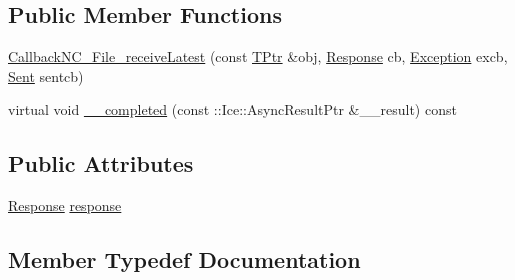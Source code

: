 \subsection*{Public Member Functions}
\begin{DoxyCompactItemize}
\item 
\hyperlink{class_file_system_1_1_callback_n_c___file__receive_latest_a4a29e3f485dcdc46b2a6e2c20af9ae35}{Callback\+N\+C\+\_\+\+File\+\_\+receive\+Latest} (const \hyperlink{class_file_system_1_1_callback_n_c___file__receive_latest_afbae5443c9515ea0676fd1201dd9eb20}{T\+Ptr} \&obj, \hyperlink{class_file_system_1_1_callback_n_c___file__receive_latest_afca5ede809f5485e6ef8d045e910dbed}{Response} cb, \hyperlink{class_file_system_1_1_callback_n_c___file__receive_latest_ab30d613e7021d1b46736b1249e24dd79}{Exception} excb, \hyperlink{class_file_system_1_1_callback_n_c___file__receive_latest_a5eb8166c1545749bdf317b280f2aff67}{Sent} sentcb)
\item 
virtual void \hyperlink{class_file_system_1_1_callback_n_c___file__receive_latest_a5e38bbf169c5d3c46891ebd0fb80ed9c}{\+\_\+\+\_\+completed} (const \+::Ice\+::\+Async\+Result\+Ptr \&\+\_\+\+\_\+result) const 
\end{DoxyCompactItemize}
\subsection*{Public Attributes}
\begin{DoxyCompactItemize}
\item 
\hyperlink{class_file_system_1_1_callback_n_c___file__receive_latest_afca5ede809f5485e6ef8d045e910dbed}{Response} \hyperlink{class_file_system_1_1_callback_n_c___file__receive_latest_aaac08282df482df1adc58d8bdaf6dbb8}{response}
\end{DoxyCompactItemize}


\subsection{Member Typedef Documentation}
\hypertarget{class_file_system_1_1_callback_n_c___file__receive_latest_ab30d613e7021d1b46736b1249e24dd79}{}
